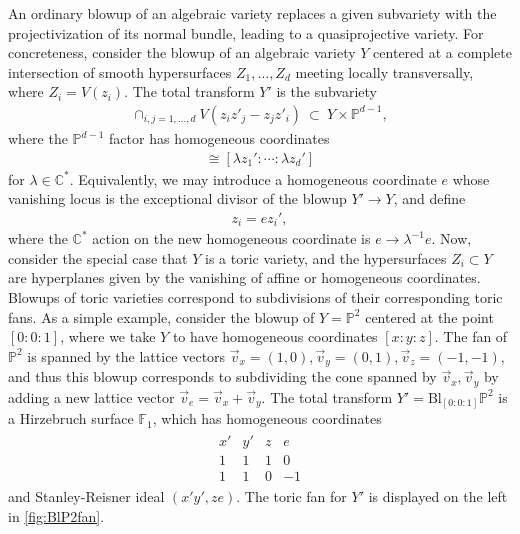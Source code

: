 \documentclass[11pt,oneside,english]{article}
\numberwithin{equation}{section}
\theoremstyle{definition}
\begin{document}
An ordinary blowup of an algebraic variety replaces a given subvariety with the projectivization of its normal bundle, leading to a quasiprojective variety. For concreteness, consider the blowup of an algebraic variety $Y$ centered at a complete intersection of smooth hypersurfaces $Z_1,\dots, Z_d$ meeting locally transversally, where $Z_i = V(z_i)$. The total transform $Y'$ is the subvariety
	\begin{align}
	\label{eqn:blowupmatrix}
		\cap_{i,j=1,\dots,d} V( z_i z'_j - z_j z'_i  )~\subset~ Y \times \mathbb P^{d-1},
	\end{align}
where the $\mathbb P^{d-1}$ factor has homogeneous coordinates 
	\begin{align}
		[ z_1': \cdots :  z_d'] \cong [ \lambda z_1' : \cdots: \lambda z_d' ]
	\end{align}
for $\lambda \in \mathbb C^*$. Equivalently, we may introduce a homogeneous coordinate $e$ whose vanishing locus is the exceptional divisor of the blowup $Y' \rightarrow Y$, and define
	\begin{align}
		 z_i  = e  z_i',
	\end{align}
where the $\mathbb C^*$ action on the new homogeneous coordinate is $e \rightarrow \lambda^{-1} e$. Now, consider the special case that $Y$ is a toric variety, and the hypersurfaces $Z_i \subset Y$ are hyperplanes given by the vanishing of affine or homogeneous coordinates. Blowups of toric varieties correspond to subdivisions of their corresponding toric fans. As a simple example, consider the blowup of $Y = \mathbb P^2$ centered at the point $[0:0:1]$, where we take $Y$ to have homogeneous coordinates $[x:y:z]$. The fan of $\mathbb P^2$ is spanned by the lattice vectors $\vec v_x = (1,0), \vec v_y = (0,1), \vec v_z = (-1,-1)$, and thus this blowup corresponds to subdividing the cone spanned by $\vec v_x, \vec v_y$ by adding a new lattice vector $\vec v_e = \vec v_x + \vec v_y$. The total transform $Y' = \text{Bl}_{[0:0:1]} \mathbb P^2$ is a Hirzebruch surface $\mathbb F_1$, which has homogeneous coordinates \cite{7d3c9f5cc0d546b3a3c103df4d4cb4f5}
	\begin{align}
	\label{eqn:BlP2coord}
		\begin{array}{cccc}   x' &  y' & z & e \\\hline  1 & 1& 1 & 0 \\  1 & 1 & 0 & -1 \end{array}
	\end{align}
and Stanley-Reisner ideal $(x'y',z e)$. The toric fan for $ Y'$ is displayed on the left in \cref{fig:BlP2fan}. 
\end{document}
